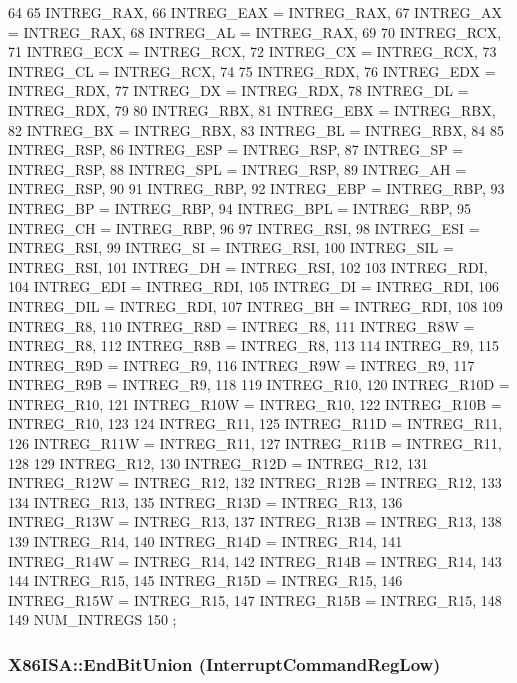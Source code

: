 \begin{DoxyCode}
64     {
65         INTREG_RAX,
66         INTREG_EAX = INTREG_RAX,
67         INTREG_AX = INTREG_RAX,
68         INTREG_AL = INTREG_RAX,
69 
70         INTREG_RCX,
71         INTREG_ECX = INTREG_RCX,
72         INTREG_CX = INTREG_RCX,
73         INTREG_CL = INTREG_RCX,
74 
75         INTREG_RDX,
76         INTREG_EDX = INTREG_RDX,
77         INTREG_DX = INTREG_RDX,
78         INTREG_DL = INTREG_RDX,
79 
80         INTREG_RBX,
81         INTREG_EBX = INTREG_RBX,
82         INTREG_BX = INTREG_RBX,
83         INTREG_BL = INTREG_RBX,
84 
85         INTREG_RSP,
86         INTREG_ESP = INTREG_RSP,
87         INTREG_SP = INTREG_RSP,
88         INTREG_SPL = INTREG_RSP,
89         INTREG_AH = INTREG_RSP,
90 
91         INTREG_RBP,
92         INTREG_EBP = INTREG_RBP,
93         INTREG_BP = INTREG_RBP,
94         INTREG_BPL = INTREG_RBP,
95         INTREG_CH = INTREG_RBP,
96 
97         INTREG_RSI,
98         INTREG_ESI = INTREG_RSI,
99         INTREG_SI = INTREG_RSI,
100         INTREG_SIL = INTREG_RSI,
101         INTREG_DH = INTREG_RSI,
102 
103         INTREG_RDI,
104         INTREG_EDI = INTREG_RDI,
105         INTREG_DI = INTREG_RDI,
106         INTREG_DIL = INTREG_RDI,
107         INTREG_BH = INTREG_RDI,
108 
109         INTREG_R8,
110         INTREG_R8D = INTREG_R8,
111         INTREG_R8W = INTREG_R8,
112         INTREG_R8B = INTREG_R8,
113 
114         INTREG_R9,
115         INTREG_R9D = INTREG_R9,
116         INTREG_R9W = INTREG_R9,
117         INTREG_R9B = INTREG_R9,
118 
119         INTREG_R10,
120         INTREG_R10D = INTREG_R10,
121         INTREG_R10W = INTREG_R10,
122         INTREG_R10B = INTREG_R10,
123 
124         INTREG_R11,
125         INTREG_R11D = INTREG_R11,
126         INTREG_R11W = INTREG_R11,
127         INTREG_R11B = INTREG_R11,
128 
129         INTREG_R12,
130         INTREG_R12D = INTREG_R12,
131         INTREG_R12W = INTREG_R12,
132         INTREG_R12B = INTREG_R12,
133 
134         INTREG_R13,
135         INTREG_R13D = INTREG_R13,
136         INTREG_R13W = INTREG_R13,
137         INTREG_R13B = INTREG_R13,
138 
139         INTREG_R14,
140         INTREG_R14D = INTREG_R14,
141         INTREG_R14W = INTREG_R14,
142         INTREG_R14B = INTREG_R14,
143 
144         INTREG_R15,
145         INTREG_R15D = INTREG_R15,
146         INTREG_R15W = INTREG_R15,
147         INTREG_R15B = INTREG_R15,
148 
149         NUM_INTREGS
150     };
\end{DoxyCode}
\hypertarget{namespaceX86ISA_a269890a6e5fc8ed9f9d9da9aae67dbdd}{
\subsubsection[{EndBitUnion}]{\setlength{\rightskip}{0pt plus 5cm}X86ISA::EndBitUnion (InterruptCommandRegLow)}}
